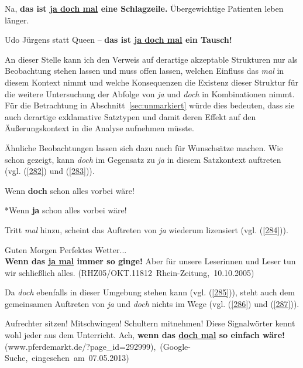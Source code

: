 {\begin{exe}
	\ex\label{280} 
	Na, \textbf{das ist \underline{ja doch mal} eine Schlagzeile.} \glqq Übergewichtige Patienten leben länger\grqq{}.
\end{exe}
\vspace{-0.4cm}
\begin{exe}
	\ex\label{281} 
	Udo Jürgens statt Queen – \textbf{das ist \underline{ja doch mal} ein Tausch!} 
\end{exe}
An dieser Stelle kann ich den Verweis auf derartige akzeptable Strukturen nur als Beobachtung stehen lassen und muss offen lassen, welchen Einfluss das \textit{mal} in diesem Kontext nimmt und welche Konsequenzen die Existenz dieser Struktur für die weitere Untersuchung der Abfolge von \textit{ja} und \textit{doch} in Kombinationen nimmt. Für die Betrachtung in Abschnitt~\ref{sec:unmarkiert} würde dies bedeuten, dass sie auch derartige exklamative Satztypen und damit deren Effekt auf den Äußerungskontext in die Analyse aufnehmen müsste.

Ähnliche Beobachtungen lassen sich dazu auch für Wunschsätze machen. Wie schon gezeigt, kann \textit{doch} im Gegensatz zu \textit{ja} in diesem Satzkontext auftreten (vgl. (\ref{282}) und (\ref{283})).

\begin{exe}
	\ex\label{282} 
	Wenn \textbf{doch} schon alles vorbei wäre!
	\hfill\hbox {\citet[140]{Hentschel1986}}
\end{exe}
\vspace{-0.5cm}
\begin{exe}
	\ex\label{283} 
	*Wenn \textbf{ja} schon alles vorbei wäre!
\end{exe}
Tritt \textit{mal} hinzu, scheint das Auftreten von \textit{ja} wiederum lizensiert (vgl. (\ref{284})).

\begin{exe}
	\ex\label{284} 
	Guten Morgen Perfektes Wetter...\\
	\textbf{Wenn das \underline{ja mal} immer so ginge!} Aber für unsere Leserinnen und Leser tun wir schließlich alles.
	\hfill\hbox{(RHZ05/OKT.11812 Rhein-Zeitung, 10.10.2005)}	
\end{exe}
Da \textit{doch} ebenfalls in dieser Umgebung stehen kann (vgl. (\ref{285})), steht auch dem gemeinsamen Auftreten von \textit{ja} und \textit{doch} nichts im Wege (vgl. (\ref{286}) und (\ref{287})).
		
\begin{exe}
	\ex\label{285} 
	Aufrechter sitzen! Mitschwingen! Schultern mitnehmen! Diese Signalwörter kennt wohl jeder aus dem Unterricht. Ach, \textbf{wenn das \underline{doch 		mal} so einfach wäre!} 
	\newline
	\hbox{}\hfill\hbox{(www.pferdemarkt.de/?page\_id=292999), (Google-Suche, eingesehen am 07.05.2013)}	
\end{exe}		

}
